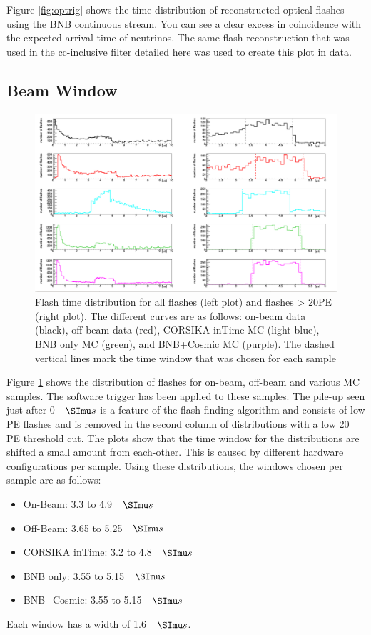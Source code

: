 Figure \ref{fig:optrig} shows the time distribution of reconstructed optical flashes using the BNB continuous stream. You can see a clear excess in coincidence with the expected arrival time of neutrinos. The same flash reconstruction that was used in the cc-inclusive filter detailed here was used to create this plot in data.
\subsection{Beam Window}

\begin{figure}[htp!]
\includegraphics[width=\textwidth]{figs/flashdist.png}
\caption{Flash time distribution for all flashes (left plot) and flashes > 20PE (right plot). The different curves are as follows: on-beam data (black), off-beam data (red), CORSIKA inTime MC (light blue), BNB only MC (green), and BNB+Cosmic MC (purple). The dashed vertical lines mark the time window that was chosen for each sample}
\label{fig:beamwindow}
\end{figure}

Figure \ref{fig:beamwindow} shows the distribution of flashes for on-beam, off-beam and various MC samples. The software trigger has been applied to these samples. The pile-up seen just after 0 $\micro s$ is a feature of the flash finding algorithm and consists of low PE flashes and is removed in the second column of distributions with a low 20 PE threshold cut. The plots show that the time window for the distributions are shifted a small amount from each-other. This is caused by different hardware configurations per sample. Using these distributions, the windows chosen per sample are as follows:
\begin{itemize}
\item{On-Beam: 3.3 to 4.9 $\micro s$}
\item{Off-Beam: 3.65 to 5.25 $\micro s$} 
\item{CORSIKA inTime: 3.2 to 4.8 $\micro s$}
\item{BNB only: 3.55 to 5.15 $\micro s$} 
\item{BNB+Cosmic: 3.55 to 5.15 $\micro s$} 
\end{itemize}
Each window has a width of 1.6 $\micro s$. 



